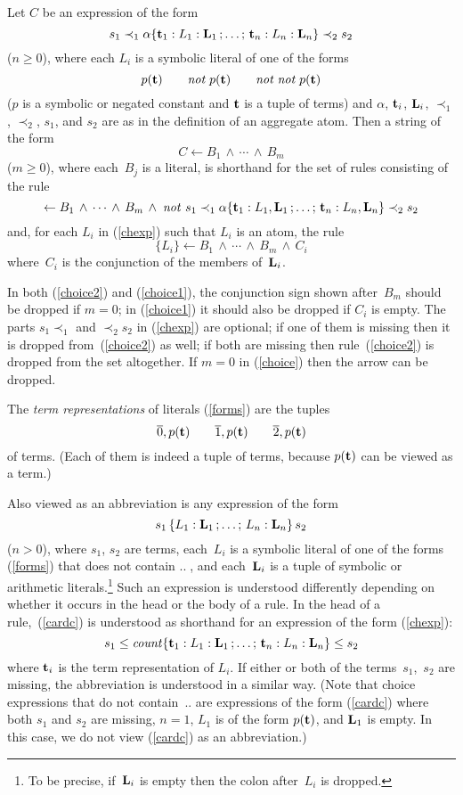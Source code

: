 \documentclass{tlp}
\def\ar{\leftarrow}
\def\beq{\begin{equation}}
\def\eeq#1{\label{#1}\end{equation}}
\def\no{{\it not}}
\begin{document}
Let $C$ be an expression of the form
\beq
s_1\prec_1
\alpha\{{\bf t}_1 : L_1 : {\bf L}_1\,;\ldots;\,{\bf t}_n : L_n : {\bf L}_n\}
\prec_2s_2
\eeq{chexp}
($n \geq 0$),
where
each $L_i$ is a symbolic literal of one of the forms
\beq
p({\bf t})\qquad  \no \; p({\bf t})\qquad   \no \; \no \; p({\bf t})
\eeq{forms}
($p$ is a symbolic or negated constant and ${\bf t}$ is a tuple of terms)
and $\alpha$, ${\bf t}_i$, ${\bf L}_i$, $\prec_1$, $\prec_2$, $s_1$, and $s_2$
are as in the definition of an aggregate atom.
Then a string of the form
\beq
C \ar B_1\,\land\,\cdots\,\land\,B_m
\eeq{choice}
($m\geq 0$), where each~$B_j$ is a literal,
 is shorthand for the set of rules consisting of the rule
\beq
\ar B_1\,\land\,\cdots\,\land\,B_m\,\land\;
  \no\ s_1\prec_1
\alpha\{{\bf t}_1 : L_1 , {\bf L}_1\,;\ldots;\,{\bf t}_n : L_n , {\bf L}_n\}
\prec_2s_2
\eeq{choice2}
and, for each $L_i$ in (\ref{chexp}) such that $L_i$ is an atom, the rule
\beq
\{L_i\} \ar B_1\,\land\,\cdots\,\land\,B_m\,\land\,C_i
\eeq{choice1}
where~$C_i$ is the conjunction of the members
of~${\bf L}_i$.

In both (\ref{choice2}) and (\ref{choice1}), the conjunction sign shown
after~$B_m$ should be dropped if $m=0$; in (\ref{choice1}) it should also
be dropped if $C_i$ is empty.  The parts $s_1\prec_1$ and $\prec_2s_2$ in
(\ref{chexp}) are optional; if one of them is
missing then it is dropped from~(\ref{choice2}) as well; if both are missing
then rule~(\ref{choice2}) is dropped from the set altogether.  If $m=0$ in
(\ref{choice}) then the arrow can be dropped.

The {\sl term representations} of literals (\ref{forms}) are the tuples
$$
\overline 0, p({\bf t})\qquad \overline 1,p({\bf t}) \qquad \overline 2, p({\bf t})
$$
of terms. (Each of them is indeed a tuple of terms, because
$p({\bf t})$ can be viewed as a term.)

Also viewed as an abbreviation is any expression of the form
\beq
s_1\,\{L_1:{\bf L}_1\,;\ldots;\,L_n:{\bf L}_n\}\,s_2
\eeq{cardc}
($n>0$), where $s_1$, $s_2$ are terms,
each~$L_i$ is a symbolic literal  of one of the forms
(\ref{forms}) that does not contain $..\;$, and each~${\bf L}_i$ is a tuple
of symbolic or arithmetic literals.\footnote{To be precise, if~${\bf L}_i$
is empty then the colon after~$L_i$ is dropped.}
Such an expression is understood differently
depending on whether it occurs in the head or the body of a rule.
In the head of a rule,~(\ref{cardc}) is understood as shorthand for
an expression of the form (\ref{chexp}):
\beq
s_1\leq
{\it count}\{{\bf t}_1: L_1 : {\bf L}_1\,;\ldots;\,{\bf t}_n: L_n : {\bf L}_n\}
\leq s_2
\eeq{choicehead}
where ${\bf t}_i$ is the term representation of $L_i$.  If either or
both of the terms~$s_1$,~$s_2$ are missing, the abbreviation is
understood in a similar way. (Note that choice expressions that do not
contain~$..$ are
expressions of the form (\ref{cardc}) where both $s_1$ and $s_2$ are missing,
$n =1$, $L_1$ is of the form $p({\bf t})$, and ${\bf L}_1$ is empty. In this
case, we do not view (\ref{cardc}) as an abbreviation.)
\end{document}
